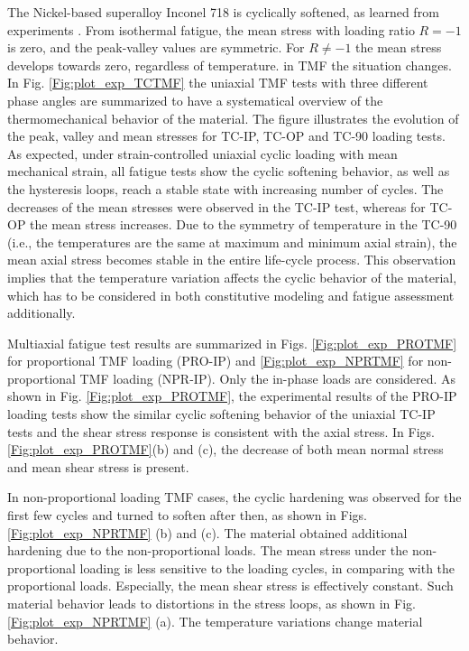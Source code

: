 \documentclass[preprint,5p,twocolumn,11pt,sort&compress]{elsarticle}
\begin{document}
The Nickel-based superalloy Inconel 718 is cyclically softened, as learned from experiments \cite{Koch85, Morrow88, Socie2000}. From isothermal fatigue, the mean stress with loading ratio $R=-1$ is zero, and the peak-valley values are symmetric. For $R\ne -1$ the mean stress develops towards zero, regardless of temperature. in TMF the situation changes. In Fig. \ref{Fig:plot_exp_TCTMF} the uniaxial TMF tests with three different phase angles are summarized to have a systematical overview of the thermomechanical behavior of the material.  The figure illustrates the evolution of the peak, valley and mean stresses for TC-IP, TC-OP and TC-90 loading tests. As expected, under strain-controlled uniaxial cyclic loading with mean mechanical strain, all fatigue tests show the cyclic softening behavior, as well as the hysteresis loops, reach a stable state with increasing number of cycles. The decreases of the mean stresses were observed in the TC-IP test, whereas for TC-OP the mean stress increases. Due to the symmetry of temperature in the TC-90 (i.e., the temperatures are the same at maximum and minimum axial strain), the mean axial stress becomes stable in the entire life-cycle process. This observation implies that the temperature variation affects the cyclic behavior of the material, which has to be considered in both constitutive modeling and fatigue assessment additionally.

Multiaxial fatigue test results are summarized in Figs. \ref{Fig:plot_exp_PROTMF} for proportional TMF loading (PRO-IP) and \ref{Fig:plot_exp_NPRTMF} for non-proportional TMF loading (NPR-IP). Only the in-phase loads are considered. 
As shown in Fig. \ref{Fig:plot_exp_PROTMF}, the experimental results of the PRO-IP loading tests show the similar cyclic softening behavior of the uniaxial TC-IP tests and the shear stress response is consistent with the axial stress. In Figs. \ref{Fig:plot_exp_PROTMF}(b) and (c), the decrease of both mean normal stress and mean shear stress is present.

In non-proportional loading TMF cases, the cyclic hardening was observed for the first few cycles and turned to soften after then, as shown in Figs. \ref{Fig:plot_exp_NPRTMF} (b) and (c). The material obtained additional hardening due to the non-proportional loads. The mean stress under the non-proportional loading is less sensitive to the loading cycles, in comparing with the proportional loads. Especially, the mean shear stress is effectively constant. Such material behavior leads to distortions in the stress loops, as shown in Fig.  \ref{Fig:plot_exp_NPRTMF} (a). The temperature variations change material behavior.
\end{document}
